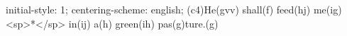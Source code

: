 initial-style: 1;
centering-scheme: english;
(c4)He(gvv) shall(f) feed(hj) me(ig) <sp>*</sp> in(ij) a(h) green(ih) pas(g)ture.(g)
